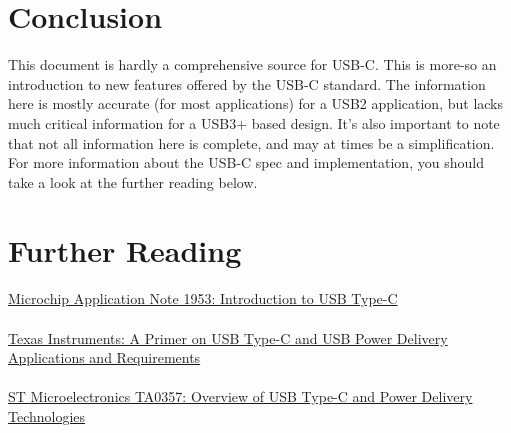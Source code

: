 \documentclass[12pt]{article}
\begin{document}

\section{Conclusion}
\noindent
This document is hardly a comprehensive source for USB-C. This is more-so an introduction to new features offered by the USB-C standard. The information here is mostly accurate (for most applications) for a USB2 application, but lacks much critical information for a USB3+ based design. It's also important to note that not all information here is complete, and may at times be a simplification.
For more information about the USB-C spec and implementation, you should take a look at the further reading below. 

\newpage

\section{Further Reading}

\href{https://ww1.microchip.com/downloads/en/appnotes/00001953a.pdf}{Microchip Application Note 1953: Introduction to USB Type-C}\\\\
\href{https://www.ti.com/lit/wp/slyy109b/slyy109b.pdf?ts=1696814775662}{Texas Instruments: A Primer on USB Type-C and USB Power Delivery Applications and Requirements}\\\\
\href{https://www.st.com/resource/en/technical_article/dm00496853-overview-of-usb-type-c-and-power-delivery-technologies-stmicroelectronics.pdf}{ST Microelectronics TA0357: Overview of USB Type-C and Power Delivery Technologies}\\\\
\end{document}
